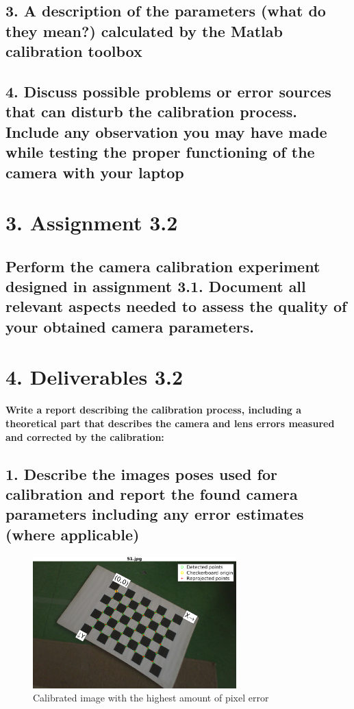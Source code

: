 \subsection*{3. A description of the parameters (what do they mean?) calculated by the Matlab calibration toolbox}

\subsection*{4. Discuss possible problems or error sources that can disturb the calibration process. Include any observation you may have made while testing the proper functioning of the camera with your laptop}

\section*{3. Assignment 3.2}
\subsection*{Perform the camera calibration experiment designed in assignment 3.1. Document all relevant aspects needed to assess the quality of your obtained camera parameters.}

\section*{4. Deliverables 3.2}
\textbf{Write a report describing the calibration process, including a theoretical part that describes the camera and lens errors measured and corrected by the calibration:}
\subsection*{1. Describe the images poses used for calibration and report the found camera parameters including any error estimates (where applicable)}
\begin{figure}[H]
\begin{center}
\includegraphics[width=0.7\textwidth]{graphics/worst.png}
\caption{Calibrated image with the highest amount of pixel error}
\label{fig:worst-calibrated-image}
\end{center}
\end{figure}

